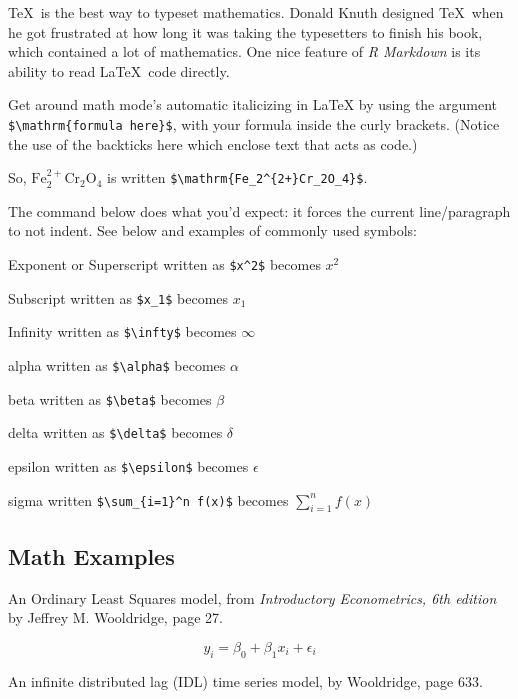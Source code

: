 \documentclass[12pt,oneside]{chicagocapstone}
\begin{document}
\TeX~is the best way to typeset mathematics. Donald Knuth designed
\TeX~when he got frustrated at how long it was taking the typesetters to
finish his book, which contained a lot of mathematics. One nice feature
of \emph{R Markdown} is its ability to read \LaTeX~code directly.

Get around math mode's automatic italicizing in LaTeX by using the
argument \texttt{\$\textbackslash{}mathrm\{formula\ here\}\$}, with your
formula inside the curly brackets. (Notice the use of the backticks here
which enclose text that acts as code.)

So, \(\mathrm{Fe_2^{2+}Cr_2O_4}\) is written
\texttt{\$\textbackslash{}mathrm\{Fe\_2\^{}\{2+\}Cr\_2O\_4\}\$}.

The \noindent command below does what you'd expect: it forces the
current line/paragraph to not indent. See below and examples of commonly
used symbols:

\noindent Exponent or Superscript written as \texttt{\$x\^{}2\$} becomes
\(x^2\)

\noindent Subscript written as \texttt{\$x\_1\$} becomes \(x_1\)

\noindent Infinity written as \texttt{\$\textbackslash{}infty\$} becomes
\(\infty\)

\noindent alpha written as \texttt{\$\textbackslash{}alpha\$} becomes
\(\alpha\)

\noindent beta written as \texttt{\$\textbackslash{}beta\$} becomes
\(\beta\)

\noindent delta written as \texttt{\$\textbackslash{}delta\$} becomes
\(\delta\)

\noindent epsilon written as \texttt{\$\textbackslash{}epsilon\$}
becomes \(\epsilon\)

\noindent sigma written
\texttt{\$\textbackslash{}sum\_\{i=1\}\^{}n\ f(x)\$} becomes
\(\sum_{i=1}^n f(x)\)

\hypertarget{math-examples}{\subsection*{Math
Examples}\label{math-examples}}

An Ordinary Least Squares model, from \emph{Introductory Econometrics,
6th edition} by Jeffrey M. Wooldridge, page 27.

\[y_i = \beta_0 + \beta_1 x_i + \epsilon_i\]

An infinite distributed lag (IDL) time series model, by Wooldridge, page
633.
\end{document}

